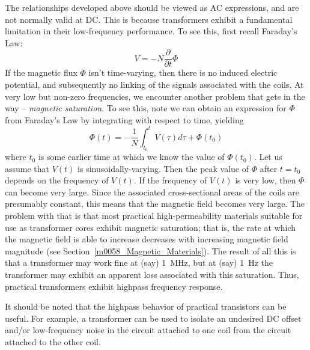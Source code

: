 The relationships developed above should be viewed as AC expressions, and are not normally valid at DC.
This is because transformers exhibit a fundamental limitation in their low-frequency performance.
To see this, first recall Faraday's Law:
%
\begin{equation}   
V = - N \frac{\partial}{\partial t} \Phi
\end{equation}
%
If the magnetic flux $\Phi$ isn't time-varying, then there is no induced electric potential, and subsequently no linking of the signals associated with the coils.
At very low but non-zero frequencies, we encounter another problem that gets in the way -- \emph{magnetic saturation}.
To see this, note we can obtain an expression for $\Phi$ from Faraday's Law by integrating with respect to time, yielding
%
\begin{equation}
\Phi(t) = -\frac{1}{N}\int_{t_0}^{t}V(\tau)d\tau + \Phi(t_0)   
\end{equation}
%
where 
$t_0$ is some earlier time at which we know the value of $\Phi(t_0)$.
Let us assume that $V(t)$ is sinusoidally-varying.
Then the peak value of $\Phi$ after $t=t_0$ depends on the frequency of $V(t)$.  
If the frequency of $V(t)$ is very low, then $\Phi$ can become very large.  Since the associated cross-sectional areas of the coils are presumably constant, this means that the magnetic field becomes very large.  The problem with that is that most practical high-permeability materials suitable for use as transformer cores exhibit magnetic saturation; that is, the rate at which the magnetic field is able to increase decreases with increasing magnetic field magnitude (see Section~\ref{m0058_Magnetic_Materials}).  
The result of all this is that a transformer may work fine at (say) 1~MHz, but at (say) 1~Hz the transformer may exhibit an apparent loss associated with this saturation.  Thus, practical transformers exhibit highpass frequency response. 

It should be noted that the highpass behavior of practical transistors can be useful. For example, a transformer can be used to isolate an undesired DC offset and/or low-frequency noise in the circuit attached to one coil from the circuit attached to the other coil.  

